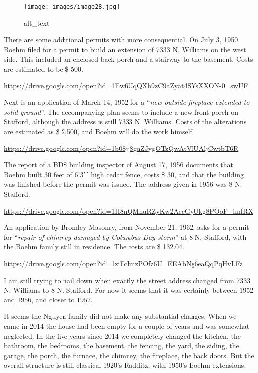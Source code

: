 \documentclass[
  12pt,
]{book}
\begin{document}
\begin{figure}
\centering
\texttt{[image: images/image28.jpg]}
\caption{alt\_text}
\end{figure}

There are some additional permits with more consequential. On July 3, 1950 Boehm filed for a permit to build an extension of 7333 N. Williams on the west side. This included an enclosed back porch and a stairway to the basement. Costs are estimated to be \$ 500.

\url{https://drive.google.com/open?id=1Ew6UqQXh9zC9aZyat4SYsXXON-0_swUF}

Next is an application of March 14, 1952 for a ``\emph{new outside fireplace extended to solid ground}''. The accompanying plan seems to include a new front porch on Stafford, although the address is still 7333 N. Williams. Costs of the alterations are estimated as \$ 2,500, and Boehm will do the work himself.

\url{https://drive.google.com/open?id=1b08jj8gqZJygOTzQwAtVlUAljCwtbT6R}

The report of a BDS building inspector of August 17, 1956 documents that Boehm built 30 feet of 6'3'\,' high cedar fence, costs \$ 30, and that the building was finished before the permit was issued. The address given in 1956 was 8 N. Stafford.

\url{https://drive.google.com/open?id=1H8nQMnuRZyKw2AccGyUkg8POoF_lmfRX}

An application by Bromley Masonry, from November 21, 1962, asks for a permit for ``\emph{repair of chimney damaged by Columbus Day storm}'' at 8 N. Stafford, with the Boehm family still in residence. The costs are \$ 132.04.

\url{https://drive.google.com/open?id=1ziFcImzPOfz6U_EEAbNg6eaQqPqHvLFz}

I am still trying to nail down when exactly the street address changed from 7333 N. Williams to 8 N. Stafford. For now it seems that it was certainly between 1952 and 1956, and closer to 1952.

It seems the Nguyen family did not make any substantial changes. When we came in 2014 the house had been empty for a couple of years and was somewhat neglected. In the five years since 2014 we completely changed the kitchen, the bathroom, the bedrooms, the basement, the fencing, the yard, the siding, the garage, the porch, the furnace, the chimney, the fireplace, the back doors. But the overall structure is still classical 1920's Radditz, with 1950's Boehm extensions.
\end{document}
